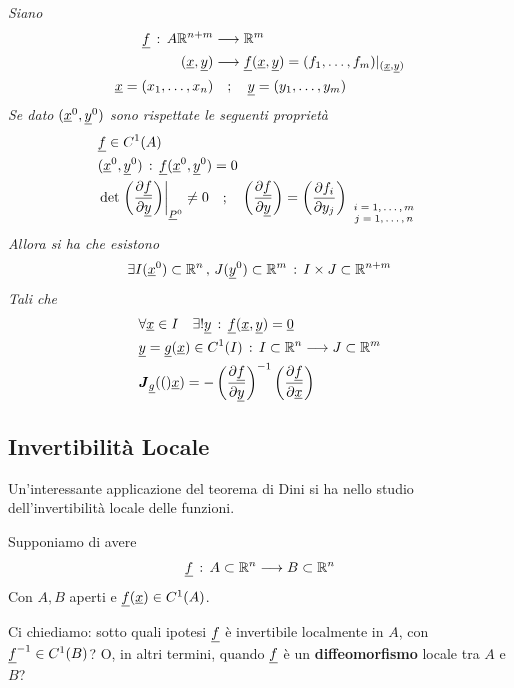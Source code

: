 \textit{Siano}
\begin{align}
	\underline{f} \, : \, A \mathbb{R}^{n+m} {}&\longrightarrow \mathbb{R}^m\\
	(\underline{x},\underline{y}) &\longrightarrow \underline{f}(\underline{x},\underline{y})= (f_1,\dots,f_m)|_{(\underline{x},\underline{y})} \nonumber \\
	\underline{x}=(x_1,\dots,x_n) &\quad ; \quad \underline{y}=(y_1,\dots , y_m)
\end{align}
\textit{Se dato $(\underline{x}^0,\underline{y}^0)$ sono rispettate le seguenti proprietà}
\begin{align}
	{}&\underline{f} \in C^1(A)\\
	&(\underline{x}^0,\underline{y}^0) \, : \, 	\underline{f}(\underline{x}^0,\underline{y}^0)=0\\
	&\det \left.\left(\frac{\partial \underline{f}}{\partial \underline{y}}\right)\right|_{\underline{P}^0} \neq 0 \quad ; \quad \left(\frac{\partial \underline{f}}{\partial \underline{y}}\right) = \left(\frac{\partial f_i}{\partial y_j}\right)_{\scriptsize{\begin{array}{cc}
				i=1,\dots,m\\
				j=1,\dots,n
	\end{array}}}
\end{align}
\textit{Allora si ha che esistono}
\begin{align}
	\exists I(\underline{x}^0) \subset \mathbb{R}^n \, , \, J(\underline{y}^0)\subset \mathbb{R}^m \, : \, I\times J \subset \mathbb{R}^{n+m}
\end{align}
\textit{Tali che}
\begin{align}
	{}&\forall \underline{x}\in I \quad\exists ! \underline{y} \, : \, \underline{f}(\underline{x},\underline{y}) =\underline{0}\\
	&\underline{y} = \underline{g}(\underline{x})\in C^1(I)\, : \, I\subset \mathbb{R}^n \longrightarrow J \subset \mathbb{R}^m \\
	&\boldsymbol{J}_{\underline{g}} (()\underline{x})= -  \left(\frac{\partial \underline{f}}{\partial \underline{y}}\right)^{-1} \left(\frac{\partial \underline{f}}{\partial \underline{x}}\right)
\end{align}

\subsection{Invertibilità Locale}

Un'interessante applicazione del teorema di Dini si ha nello studio dell'invertibilità locale delle funzioni.

Supponiamo di avere
\begin{align}
	\underline{f} \, : \, A \subset \mathbb{R}^n \longrightarrow B \subset \mathbb{R}^n
\end{align}
Con $A,B$ aperti e $\underline{f}(\underline{x})\in C^1(A)$.

Ci chiediamo: sotto quali ipotesi $\underline{f}$ è invertibile localmente in $A$, con $\underline{f}^{-1}\in C^1(B)$? O, in altri termini, quando $\underline{f}$ è un \textbf{diffeomorfismo} locale tra $A$ e $B$? 

